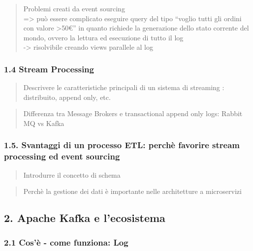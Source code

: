 \documentclass[]{article}
\newcommand{\euro}{€}
\begin{document}
\begin{quote}
Problemi creati da event sourcing\\
=\textgreater{} può essere complicato eseguire query del tipo ``voglio
tutti gli ordini con valore \textgreater{}50\euro{}'' in quanto richiede
la generazione dello stato corrente del mondo, ovvero la lettura ed
esecuzione di tutto il log\\
-\textgreater{} risolvibile creando views parallele al log
\end{quote}

\subsubsection{1.4 Stream Processing}\label{stream-processing}

\begin{quote}
Descrivere le caratteristiche principali di un sistema di streaming :
distribuito, append only, etc.
\end{quote}

\begin{quote}
Differenza tra Message Brokers e transactional append only logs: Rabbit
MQ vs Kafka
\end{quote}

\subsubsection{1.5. Svantaggi di un processo ETL: perchè favorire stream
processing ed event
sourcing}\label{svantaggi-di-un-processo-etl-perchuxe8-favorire-stream-processing-ed-event-sourcing}

\begin{quote}
Introdurre il concetto di schema
\end{quote}

\begin{quote}
Perchè la gestione dei dati è importante nelle architetture a
microservizi
\end{quote}

\subsection{2. Apache Kafka e
l'ecosistema}\label{apache-kafka-e-lecosistema}

\subsubsection{2.1 Cos'è - come funziona:
Log}\label{cosuxe8---come-funziona-log}
\end{document}

